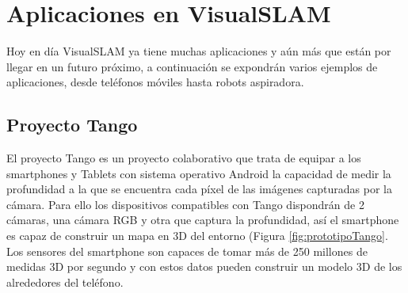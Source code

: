 \parskip=0pt
\section{Aplicaciones en VisualSLAM} \label{s:aplicaciones}

Hoy en día VisualSLAM ya tiene muchas aplicaciones y aún más que están por llegar en un futuro próximo, a continuación se expondrán varios ejemplos de aplicaciones, desde teléfonos móviles hasta robots aspiradora.

\subsection{Proyecto Tango}
El proyecto Tango es un proyecto colaborativo que trata de equipar a los smartphones y Tablets con sistema operativo Android la capacidad de medir la profundidad a la que se encuentra cada píxel de las imágenes capturadas por la cámara. Para ello los dispositivos compatibles con Tango dispondrán de 2 cámaras, una cámara RGB y otra que captura la profundidad, así el smartphone es capaz de construir un mapa en 3D del entorno (Figura \ref{fig:prototipoTango}. Los sensores del smartphone son capaces de tomar más de 250 millones de medidas 3D por segundo y con estos datos pueden  construir un modelo 3D de los alrededores del teléfono.
